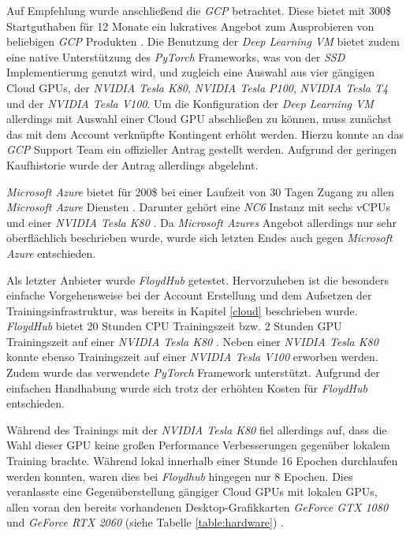 Auf Empfehlung wurde anschließend die \textit{GCP} betrachtet. Diese bietet mit 300\$ Startguthaben für 12 Monate ein lukratives Angebot zum Ausprobieren von beliebigen \textit{GCP} Produkten \cite{GoogleCloudPlatform.20200314b}. Die Benutzung der \textit{Deep Learning VM} bietet zudem eine native Unterstützung des \textit{PyTorch} Frameworks, was von der \textit{SSD} Implementierung genutzt wird, und zugleich eine Auswahl aus vier gängigen Cloud GPUs, der \textit{NVIDIA Tesla K80}, \textit{NVIDIA Tesla P100}, \textit{NVIDIA Tesla T4} und der \textit{NVIDIA Tesla V100}. Um die Konfiguration der \textit{Deep Learning VM} allerdings mit Auswahl einer Cloud GPU abschließen zu können, muss zunächst das mit dem Account verknüpfte Kontingent erhöht werden. Hierzu konnte an das \textit{GCP} Support Team ein offizieller Antrag gestellt werden. Aufgrund der geringen Kaufhistorie wurde der Antrag allerdings abgelehnt. 

\textit{Microsoft Azure} bietet für 200\$ bei einer Laufzeit von 30 Tagen Zugang zu allen \textit{Microsoft Azure} Diensten \cite{MicrosoftAzure.2020}. Darunter gehört eine \textit{NC6} Instanz mit sechs vCPUs und einer \textit{NVIDIA Tesla K80} \cite{MicrosoftAzure.202003124}. Da \textit{Microsoft Azures} Angebot allerdings nur sehr oberflächlich beschrieben wurde, wurde sich letzten Endes auch gegen \textit{Microsoft Azure} entschieden. 

Als letzter Anbieter wurde \textit{FloydHub} getestet. Hervorzuheben ist die besonders einfache Vorgehensweise bei der Account Erstellung und dem Aufsetzen der Trainingsinfrastruktur, was bereits in Kapitel \ref{cloud} beschrieben wurde. \textit{FloydHub} bietet 20 Stunden CPU Trainingszeit bzw. 2 Stunden GPU Trainingszeit auf einer \textit{NVIDIA Tesla K80} \cite{FloydHub.2020}. Neben einer \textit{NVIDIA Tesla K80} konnte ebenso Trainingszeit auf einer \textit{NVIDIA Tesla V100} erworben werden. Zudem wurde das verwendete \textit{PyTorch} Framework unterstützt. Aufgrund der einfachen Handhabung wurde sich trotz der erhöhten Kosten für \textit{FloydHub} entschieden. 

Während des Trainings mit der \textit{NVIDIA Tesla K80} fiel allerdings auf, dass die Wahl dieser GPU keine großen Performance Verbesserungen gegenüber lokalem Training brachte. Während lokal innerhalb einer Stunde 16 Epochen durchlaufen werden konnten, waren dies bei \textit{Floydhub} hingegen nur 8 Epochen. Dies veranlasste eine Gegenüberstellung gängiger Cloud GPUs mit lokalen GPUs, allen voran den bereits vorhandenen Desktop-Grafikkarten \textit{GeForce GTX 1080} und \textit{GeForce RTX 2060} (siehe Tabelle \ref{table:hardware}) \cite{TechPowerUp.20200209}.

